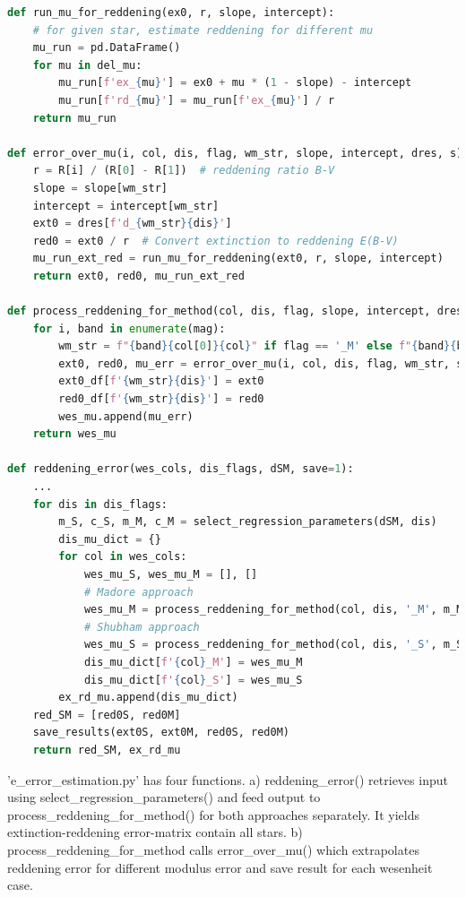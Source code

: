 \documentclass{article}
\begin{document}
\begin{lstlisting}[language=Python, caption=dependencies for main.py]
def run_mu_for_reddening(ex0, r, slope, intercept):
    # for given star, estimate reddening for different mu
    mu_run = pd.DataFrame() 
    for mu in del_mu:
        mu_run[f'ex_{mu}'] = ex0 + mu * (1 - slope) - intercept
        mu_run[f'rd_{mu}'] = mu_run[f'ex_{mu}'] / r
    return mu_run

def error_over_mu(i, col, dis, flag, wm_str, slope, intercept, dres, s):
    r = R[i] / (R[0] - R[1])  # reddening ratio B-V
    slope = slope[wm_str]
    intercept = intercept[wm_str]
    ext0 = dres[f'd_{wm_str}{dis}']
    red0 = ext0 / r  # Convert extinction to reddening E(B-V)
    mu_run_ext_red = run_mu_for_reddening(ext0, r, slope, intercept)
    return ext0, red0, mu_run_ext_red

def process_reddening_for_method(col, dis, flag, slope, intercept, dres, wes_mu, ext0_df, red0_df, s):
    for i, band in enumerate(mag):
        wm_str = f"{band}{col[0]}{col}" if flag == '_M' else f"{band}{band}{col}"
        ext0, red0, mu_err = error_over_mu(i, col, dis, flag, wm_str, slope, intercept, dres, s)        
        ext0_df[f'{wm_str}{dis}'] = ext0
        red0_df[f'{wm_str}{dis}'] = red0
        wes_mu.append(mu_err)
    return wes_mu

def reddening_error(wes_cols, dis_flags, dSM, save=1):
    ...
    for dis in dis_flags:
        m_S, c_S, m_M, c_M = select_regression_parameters(dSM, dis)
        dis_mu_dict = {}
        for col in wes_cols:
            wes_mu_S, wes_mu_M = [], []
            # Madore approach
            wes_mu_M = process_reddening_for_method(col, dis, '_M', m_M, c_M, dSM[1][1], wes_mu_M, ext0M, red0M, save)       
            # Shubham approach
            wes_mu_S = process_reddening_for_method(col, dis, '_S', m_S, c_S, dSM[1][0], wes_mu_S, ext0S, red0S, save)
            dis_mu_dict[f'{col}_M'] = wes_mu_M
            dis_mu_dict[f'{col}_S'] = wes_mu_S
        ex_rd_mu.append(dis_mu_dict)
    red_SM = [red0S, red0M]
    save_results(ext0S, ext0M, red0S, red0M)
    return red_SM, ex_rd_mu


\end{lstlisting}

'e\_error\_estimation.py' has four functions. a) reddening\_error() retrieves input using select\_regression\_parameters() and feed output to process\_reddening\_for\_method() for both approaches separately. It yields extinction-reddening error-matrix contain all stars. b) process\_reddening\_for\_method calls error\_over\_mu() which extrapolates reddening error for different modulus error and save result for each wesenheit case.  
\end{document}
